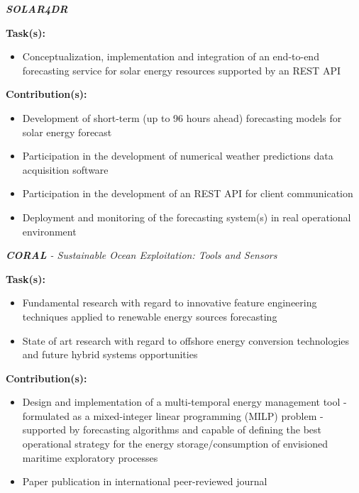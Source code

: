 \documentclass{mycv}
\begin{document}
\begin{myitemize}	
	\item \textit{\textbf{SOLAR4DR}}

		\vspace{0.4cm}
		\textbf{Task(s):}
		
		\begin{itemize}[itemsep=1px]
			\item Conceptualization, implementation and integration of an end-to-end forecasting service for solar energy resources supported by an REST API
		\end{itemize}
		
		\vspace{0.2cm}
		\textbf{Contribution(s):}
		
		\begin{itemize}[itemsep=1px]
			\item Development of short-term (up to 96 hours ahead) forecasting models for solar energy forecast
			\item Participation in the development of numerical weather predictions data acquisition software
			\item Participation in the development of an REST API for client communication
			\item Deployment and monitoring of the forecasting system(s) in real operational environment
		\end{itemize}
	
	
	\vspace{0.6cm}	

	\item \textit{\textbf{CORAL} - Sustainable Ocean Exploitation: Tools and Sensors}

		\vspace{0.4cm}
		\textbf{Task(s):}

		\begin{itemize}[itemsep=1px]
			\item Fundamental research with regard to innovative feature engineering techniques applied to renewable energy sources forecasting
			\item State of art research with regard to offshore energy conversion technologies and future hybrid systems opportunities
		\end{itemize}
		
		\vspace{0.2cm}
		\textbf{Contribution(s):}
		
		\begin{itemize}[itemsep=1px]
			\item Design and implementation of a multi-temporal energy management tool - formulated as a mixed-integer linear programming (MILP) problem - supported by forecasting algorithms and capable of defining the best operational strategy for the energy storage/consumption of envisioned maritime exploratory processes
			\item Paper publication in international peer-reviewed journal
		\end{itemize}
		


		
\end{myitemize}
\end{document}

